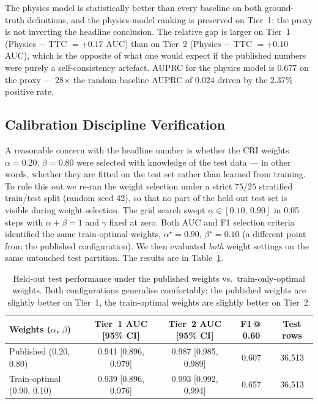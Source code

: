 \documentclass[sn-mathphys-num,Numbered,iicol]{sn-jnl}
\begin{document}
The physics model is statistically better than every baseline on both ground-truth definitions, and the physics-model ranking is preserved on Tier~1: the proxy is not inverting the headline conclusion. The relative gap is larger on Tier~1 (Physics $-$ TTC $=+0.17$ AUC) than on Tier~2 (Physics $-$ TTC $=+0.10$ AUC), which is the opposite of what one would expect if the published numbers were purely a self-consistency artefact. AUPRC for the physics model is 0.677 on the proxy --- 28$\times$ the random-baseline AUPRC of 0.024 driven by the 2.37\% positive rate.

\subsection{Calibration Discipline Verification}\label{sec:calib}
A reasonable concern with the headline number is whether the CRI weights $\alpha=0.20$, $\beta=0.80$ were selected with knowledge of the test data --- in other words, whether they are fitted on the test set rather than learned from training. To rule this out we re-ran the weight selection under a strict $75/25$ stratified train/test split (random seed 42), so that no part of the held-out test set is visible during weight selection. The grid search swept $\alpha \in [0.10,\,0.90]$ in 0.05 steps with $\alpha + \beta = 1$ and $\gamma$ fixed at zero. Both AUC and F1 selection criteria identified the same train-optimal weights, $\alpha^{\star}=0.90$, $\beta^{\star}=0.10$ (a different point from the published configuration). We then evaluated \emph{both} weight settings on the same untouched test partition. The results are in Table~\ref{tab:calib}.

\begin{table}[htbp]
  \centering
  \caption{Held-out test performance under the published weights vs.\ train-only-optimal weights. Both configurations generalise comfortably; the published weights are slightly better on Tier~1, the train-optimal weights are slightly better on Tier~2.}
  \label{tab:calib}
  \renewcommand{\arraystretch}{1.2}
  \begin{tabular}{@{}lcccc@{}}
    \toprule
    \textbf{Weights ($\alpha$, $\beta$)} & \textbf{Tier~1 AUC [95\% CI]} & \textbf{Tier~2 AUC [95\% CI]} & \textbf{F1\,@\,0.60} & \textbf{Test rows} \\
    \midrule
    Published (0.20, 0.80)        & 0.941 [0.896, 0.979] & 0.987 [0.985, 0.989] & 0.607 & 36{,}513 \\
    Train-optimal (0.90, 0.10)    & 0.939 [0.896, 0.976] & 0.993 [0.992, 0.994] & 0.657 & 36{,}513 \\
    \bottomrule
  \end{tabular}
\end{table}
\end{document}
